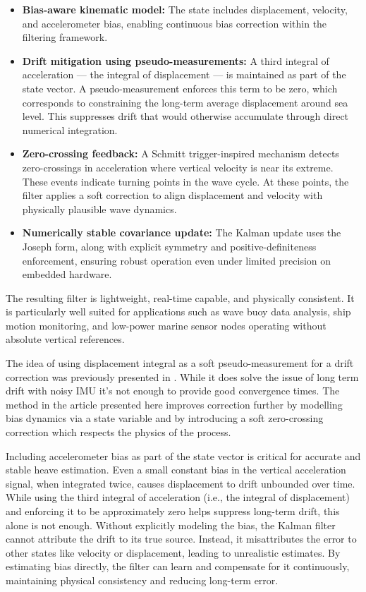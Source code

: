 \documentclass[11pt,letterpaper]{article}
\begin{document}
\begin{itemize}
    \item \textbf{Bias-aware kinematic model:} The state includes displacement, velocity, and accelerometer bias, enabling continuous bias correction within the filtering framework.
    
    \item \textbf{Drift mitigation using pseudo-measurements:} A third integral of acceleration --- the integral of displacement --- is maintained as part of the state vector. A pseudo-measurement enforces this term to be zero, which corresponds to constraining the long-term average displacement around sea level. This suppresses drift that would otherwise accumulate through direct numerical integration.
    
    \item \textbf{Zero-crossing feedback:} A Schmitt trigger-inspired mechanism detects zero-crossings in acceleration where vertical velocity is near its extreme. These events indicate turning points in the wave cycle. At these points, the filter applies a soft correction to align displacement and velocity with physically plausible wave dynamics.
    
    \item \textbf{Numerically stable covariance update:} The Kalman update uses the Joseph form, along with explicit symmetry and positive-definiteness enforcement, ensuring robust operation even under limited precision on embedded hardware.
\end{itemize}

The resulting filter is lightweight, real-time capable, and physically consistent. It is particularly well suited for applications such as wave buoy data analysis, ship motion monitoring, and low-power marine sensor nodes operating without absolute vertical references.

The idea of using displacement integral as a soft pseudo-measurement for a drift correction was previously presented in \cite{Sharkh2014}. While it does solve the issue of long term drift with noisy IMU it's not enough to provide good convergence times. The method in the article presented here improves correction further by modelling bias dynamics via a state variable and by introducing
a soft zero-crossing correction which respects the physics of the process.

Including accelerometer bias as part of the state vector is critical for accurate and stable heave estimation. Even a small constant bias in the vertical acceleration signal, when integrated twice, causes displacement to drift unbounded over time. While using the third integral of acceleration (i.e., the integral of displacement) and enforcing it to be approximately zero helps suppress long-term drift, this alone is not enough. Without explicitly modeling the bias, the Kalman filter cannot attribute the drift to its true source. Instead, it misattributes the error to other states like velocity or displacement, leading to unrealistic estimates. By estimating bias directly, the filter can learn and compensate for it continuously, maintaining physical consistency and reducing long-term error.
\end{document}
